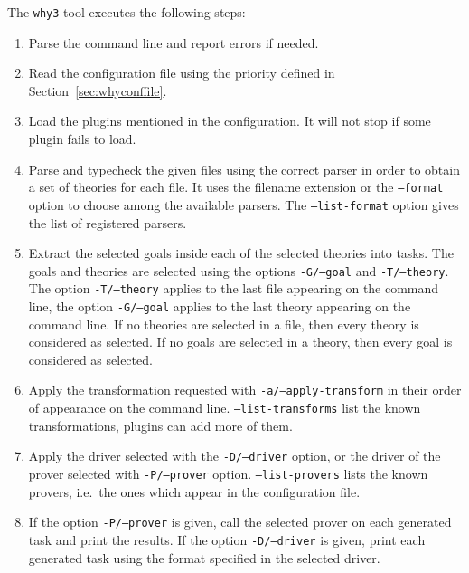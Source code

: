 The \texttt{why3} tool executes the following steps:
\begin{enumerate}
\item Parse the command line and report errors if needed.
\item Read the configuration file using the priority defined in
  Section~\ref{sec:whyconffile}.
\item Load the plugins mentioned in the configuration. It will not
  stop if some plugin fails to load.
\item Parse and typecheck the given files using the correct parser in order
  to obtain a set of \why theories for each file. It uses
  the filename extension or the \texttt{--format} option to choose
  among the available parsers. The \texttt{--list-format} option gives
  the list of registered parsers.
\item Extract the selected goals inside each of the selected theories
  into tasks. The goals and theories are selected using the options
  \texttt{-G/--goal} and \texttt{-T/--theory}. The option
  \texttt{-T/--theory} applies to the last file appearing on the
  command line, the option \texttt{-G/--goal} applies to the last theory
  appearing on the command line. If no theories are selected in a file,
  then every theory is considered as selected. If no goals are selected
  in a theory, then every goal is considered as selected.
\item Apply the transformation requested
  with \texttt{-a/--apply-transform} in their order of appearance on the
  command line. \texttt{--list-transforms} list the known
  transformations, plugins can add more of them.
\item Apply the driver selected with the \texttt{-D/--driver} option,
  or the driver of the prover selected with \texttt{-P/--prover}
  option. \texttt{--list-provers} lists the known provers, i.e.~the ones
  which appear in the configuration file.
\item If the option \texttt{-P/--prover} is given, call the selected prover
  on each generated task and print the results. If the option
  \texttt{-D/--driver} is given, print each generated task using
  the format specified in the selected driver.
\end{enumerate}


